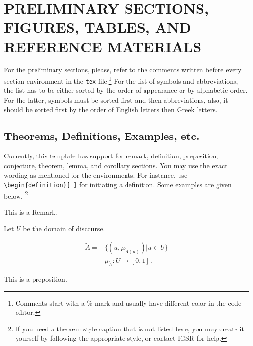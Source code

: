 \chapter{PRELIMINARY SECTIONS, FIGURES, TABLES, AND REFERENCE MATERIALS}\label{ch:preliminary}
For the preliminary sections, please, refer to the comments written before every section environment in the \texttt{tex} file.\footnote{Comments start with a \% mark and usually have different color in the code editor.} For the list of symbols and abbreviations, the list has to be either sorted by the order of appearance or by alphabetic order. For the latter, symbols must be sorted first and then abbreviations, also, it should be sorted first by the order of English letters then Greek letters.

\section{Theorems, Definitions, Examples, etc.}\label{sec:theorems}
Currently, this template has support for remark, definition, preposition, conjecture, theorem, lemma, and corollary sections. You may use the exact wording as mentioned for the environments. For instance, use \texttt{\textbackslash{begin\{definition\}[ ]}} for initiating a definition. Some examples are given below. \footnote{If you need a theorem style caption that is not listed here, you may create it yourself by following the appropriate style, or contact IGSR for help.}

\begin{remark}
This is a Remark.
\end{remark}

\begin{definition}
Let $U$ be the domain of discourse.
\end{definition}

\begin{eqnarray}
\label{fuzzy_set}
\tilde{A}=&\{(u,\mu_{\tilde{A}(u)})| u \in U\}
\nonumber
\\
&\mu_{\tilde{A}}:U \longrightarrow [0,1]
\,.
\end{eqnarray}

\begin{proposition}
This is a preposition.
\end{proposition}


